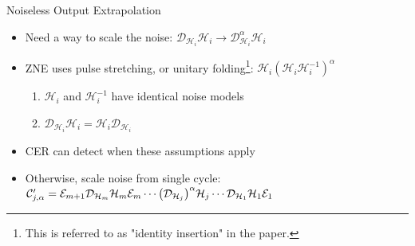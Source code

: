 \documentclass[11pt,aspectratio=1610,xcolor=dvipsnames]{beamer}
\begin{document}
\begin{frame}{Noiseless Output Extrapolation}
	\begin{itemize}[<+->]
		\item Need a way to scale the noise: $\mathcal{D}_{\mathcal{H}_i} \mathcal{H}_i \to \mathcal{D}_{\mathcal{H}_i}^\alpha \mathcal{H}_i$
		\item ZNE uses pulse stretching, or unitary folding\footnote{This is referred to as "identity insertion" in the paper.}: $\mathcal{H}_i(\mathcal{H}_i\mathcal{H}_i^{-1})^\alpha$
		      \begin{enumerate}
			      \item $\mathcal{H}_i$ and $\mathcal{H}_i^{-1}$ have identical noise models
			      \item $\mathcal{D}_{\mathcal{H}_i}\mathcal{H}_i = \mathcal{H}_i\mathcal{D}_{\mathcal{H}_i}$
		      \end{enumerate}
		\item CER can detect when these assumptions apply
		\item Otherwise, scale noise from single cycle: $\mathcal{C}'_{j, \alpha} = \mathcal{E}_{m + 1}\mathcal{D}_{\mathcal{H}_m}\mathcal{H}_m\mathcal{E}_m \cdots \qty(\mathcal{D}_{\mathcal{H}_j})^\alpha \mathcal{H}_j \cdots \mathcal{D}_{\mathcal{H}_1}\mathcal{H}_1\mathcal{E}_1$
	\end{itemize}

\end{frame}
\end{document}
